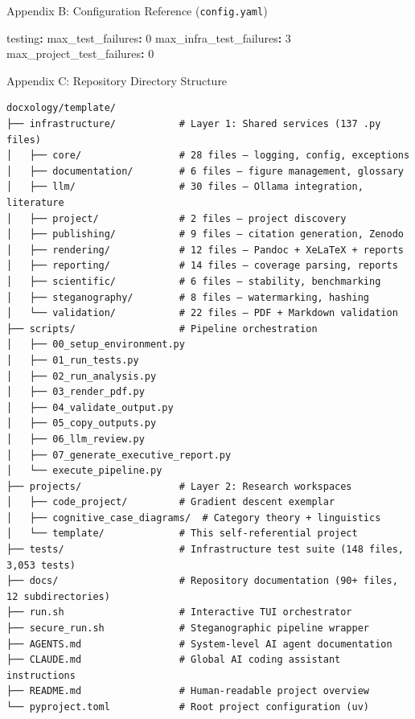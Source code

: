 \documentclass[
  ignorenonframetext,
]{beamer}
\newenvironment{Shaded}{}{}
\newcommand{\AttributeTok}[1]{\textcolor[rgb]{0.49,0.56,0.16}{#1}}
\newcommand{\DecValTok}[1]{\textcolor[rgb]{0.25,0.63,0.44}{#1}}
\newcommand{\FunctionTok}[1]{\textcolor[rgb]{0.02,0.16,0.49}{#1}}
\newcommand{\KeywordTok}[1]{\textcolor[rgb]{0.00,0.44,0.13}{\textbf{#1}}}
\begin{document}
\begin{frame}[fragile]{Appendix B: Configuration Reference
(\texttt{config.yaml})}
\begin{Shaded}
\begin{Highlighting}[]
\FunctionTok{testing}\KeywordTok{:}
\AttributeTok{  }\FunctionTok{max\_test\_failures}\KeywordTok{:}\AttributeTok{ }\DecValTok{0}
\AttributeTok{  }\FunctionTok{max\_infra\_test\_failures}\KeywordTok{:}\AttributeTok{ }\DecValTok{3}
\AttributeTok{  }\FunctionTok{max\_project\_test\_failures}\KeywordTok{:}\AttributeTok{ }\DecValTok{0}
\end{Highlighting}
\end{Shaded}
\end{frame}

\begin{frame}[fragile]{Appendix C: Repository Directory Structure}
\protect{}\label{appendix-c-repository-directory-structure}
\begin{verbatim}
docxology/template/
├── infrastructure/           # Layer 1: Shared services (137 .py files)
│   ├── core/                 # 28 files — logging, config, exceptions
│   ├── documentation/        # 6 files — figure management, glossary
│   ├── llm/                  # 30 files — Ollama integration, literature
│   ├── project/              # 2 files — project discovery
│   ├── publishing/           # 9 files — citation generation, Zenodo
│   ├── rendering/            # 12 files — Pandoc + XeLaTeX + reports
│   ├── reporting/            # 14 files — coverage parsing, reports
│   ├── scientific/           # 6 files — stability, benchmarking
│   ├── steganography/        # 8 files — watermarking, hashing
│   └── validation/           # 22 files — PDF + Markdown validation
├── scripts/                  # Pipeline orchestration
│   ├── 00_setup_environment.py
│   ├── 01_run_tests.py
│   ├── 02_run_analysis.py
│   ├── 03_render_pdf.py
│   ├── 04_validate_output.py
│   ├── 05_copy_outputs.py
│   ├── 06_llm_review.py
│   ├── 07_generate_executive_report.py
│   └── execute_pipeline.py
├── projects/                 # Layer 2: Research workspaces
│   ├── code_project/         # Gradient descent exemplar
│   ├── cognitive_case_diagrams/  # Category theory + linguistics
│   └── template/             # This self-referential project
├── tests/                    # Infrastructure test suite (148 files, 3,053 tests)
├── docs/                     # Repository documentation (90+ files, 12 subdirectories)
├── run.sh                    # Interactive TUI orchestrator
├── secure_run.sh             # Steganographic pipeline wrapper
├── AGENTS.md                 # System-level AI agent documentation
├── CLAUDE.md                 # Global AI coding assistant instructions
├── README.md                 # Human-readable project overview
└── pyproject.toml            # Root project configuration (uv)
\end{verbatim}
\end{frame}
\end{document}
